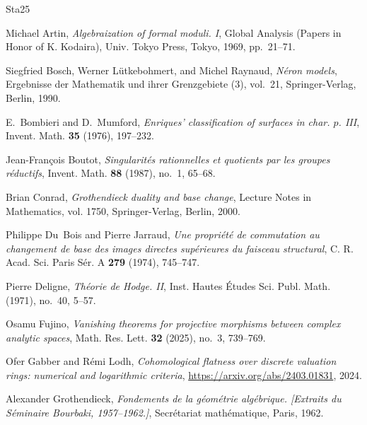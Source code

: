 \documentclass{amsart}
\theoremstyle{definition}
\theoremstyle{remark}
\let \cedilla =\c
\renewcommand{\c}[0]{{\mathbb C}}
\begin{document}
\begin{thebibliography}{{Sta}25}

Michael Artin, \emph{Algebraization of formal moduli. {I}}, Global Analysis
  (Papers in Honor of K. Kodaira), Univ. Tokyo Press, Tokyo, 1969, pp.~21--71.

Siegfried Bosch, Werner L{\"u}tkebohmert, and Michel Raynaud, \emph{N\'eron
  models}, Ergebnisse der Mathematik und ihrer Grenzgebiete (3), vol.~21,
  Springer-Verlag, Berlin, 1990. 

E.~Bombieri and D.~Mumford, \emph{Enriques' classification of surfaces in char.
  {$p$}. {III}}, Invent. Math. \textbf{35} (1976), 197--232. 

Jean-Fran{\cedilla{c}}ois Boutot, \emph{Singularit\'es rationnelles et
  quotients par les groupes r\'eductifs}, Invent. Math. \textbf{88} (1987),
  no.~1, 65--68. 

Brian Conrad, \emph{Grothendieck duality and base change}, Lecture Notes in
  Mathematics, vol. 1750, Springer-Verlag, Berlin, 2000. 

Philippe Du~Bois and Pierre Jarraud, \emph{Une propri\'et\'e de commutation au
  changement de base des images directes sup\'erieures du faisceau structural},
  C. R. Acad. Sci. Paris S\'er. A \textbf{279} (1974), 745--747. 

Pierre Deligne, \emph{Th\'eorie de {H}odge. {II}}, Inst. Hautes \'Etudes Sci.
  Publ. Math. (1971), no.~40, 5--57. 

Osamu Fujino, \emph{Vanishing theorems for projective morphisms between complex
  analytic spaces}, Math. Res. Lett. \textbf{32} (2025), no.~3, 739--769.

Ofer Gabber and Rémi Lodh, \emph{Cohomological flatness over discrete
  valuation rings: numerical and logarithmic criteria},
  \url{https://arxiv.org/abs/2403.01831}, 2024.

Alexander Grothendieck, \emph{Fondements de la g\'eom\'etrie alg\'ebrique.
  [{E}xtraits du {S}\'eminaire {B}ourbaki, 1957--1962.]}, Secr\'etariat
  math\'ematique, Paris, 1962. 


\end{thebibliography}
\end{document}
